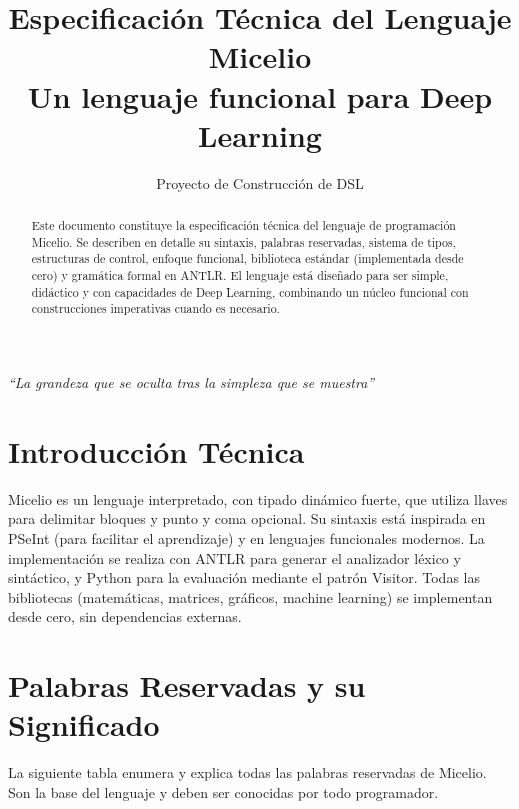 \documentclass[12pt]{article}
\title{Especificación Técnica del Lenguaje Micelio \\ \large Un lenguaje funcional para Deep Learning}
\author{Proyecto de Construcción de DSL}
\begin{document}
\maketitle

\begin{center}
\Large \textit{“La grandeza que se oculta tras la simpleza que se muestra”}
\end{center}

\begin{abstract}
Este documento constituye la especificación técnica del lenguaje de programación Micelio. Se describen en detalle su sintaxis, palabras reservadas, sistema de tipos, estructuras de control, enfoque funcional, biblioteca estándar (implementada desde cero) y gramática formal en ANTLR. El lenguaje está diseñado para ser simple, didáctico y con capacidades de Deep Learning, combinando un núcleo funcional con construcciones imperativas cuando es necesario.
\end{abstract}

\tableofcontents
\newpage

\section{Introducción Técnica}

Micelio es un lenguaje interpretado, con tipado dinámico fuerte, que utiliza llaves para delimitar bloques y punto y coma opcional. Su sintaxis está inspirada en PSeInt (para facilitar el aprendizaje) y en lenguajes funcionales modernos. La implementación se realiza con ANTLR para generar el analizador léxico y sintáctico, y Python para la evaluación mediante el patrón Visitor. Todas las bibliotecas (matemáticas, matrices, gráficos, machine learning) se implementan desde cero, sin dependencias externas.

\section{Palabras Reservadas y su Significado}

La siguiente tabla enumera y explica todas las palabras reservadas de Micelio. Son la base del lenguaje y deben ser conocidas por todo programador.
\end{document}
